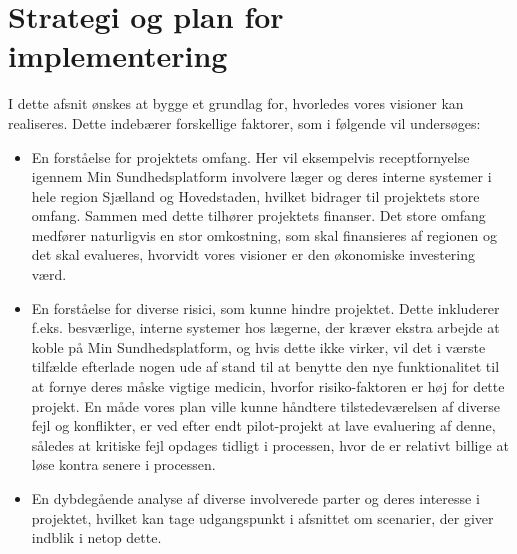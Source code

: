 \section{Strategi og plan for implementering}
I dette afsnit ønskes at bygge et grundlag for, hvorledes vores visioner kan realiseres.
Dette indebærer forskellige faktorer, som i følgende vil undersøges:
\begin{itemize}
  \item En forståelse for projektets omfang. Her vil eksempelvis receptfornyelse igennem Min Sundhedsplatform involvere læger og deres interne systemer i hele region Sjælland og Hovedstaden, hvilket bidrager til projektets store omfang. Sammen med dette tilhører projektets finanser. Det store omfang medfører naturligvis en stor omkostning, som skal finansieres af regionen og det skal evalueres, hvorvidt vores visioner er den økonomiske investering værd. 
  \item En forståelse for diverse risici, som kunne hindre projektet. Dette inkluderer f.eks. besværlige, interne systemer hos lægerne, der kræver ekstra arbejde at koble på Min Sundhedsplatform, og hvis dette ikke virker, vil det i værste tilfælde efterlade nogen ude af stand til at benytte den nye funktionalitet til at fornye deres måske vigtige medicin, hvorfor risiko-faktoren er høj for dette projekt. 
  En måde vores plan ville kunne håndtere tilstedeværelsen af diverse fejl og konflikter, er ved efter endt pilot-projekt at lave evaluering af denne, således at kritiske fejl opdages tidligt i processen, hvor de er relativt billige at løse kontra senere i processen.  
  \item En dybdegående analyse af diverse involverede parter og deres interesse i projektet, hvilket kan tage udgangspunkt i afsnittet om scenarier, der giver indblik i netop dette. 
\end{itemize}

